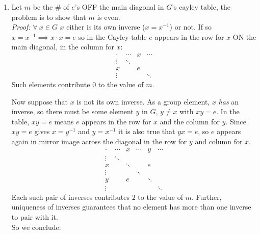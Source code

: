 \begin{enumerate}
    \item Let $m$ be the \# of $e$'s OFF the main diagonal in $G$'s cayley table, the problem is to show that $m$ is even. \\
    \textit{Proof:} $\forall \ x \in G$ $x$ either is its own inverse ($x=x^{-1}$) or not. If so $x=x^{-1} \implies x \cdot x = e$ so in the Cayley table $e$ appears in the row for $x$ ON the main diagonal, in the column for $x$:
     \[
            \begin{array}{c||c|c|c}
                \cdot & \cdots & x & \cdots \\  
                \hline \hline
                 \vdots & \ddots &  &   \\ \hline
                x &  & e &   \\ \hline
                \vdots &  &   & \ddots
            \end{array}
    \] Such elements contribute $0$ to the value of $m$. \\ \steezybreak

    Now suppose that $x$ is not its own inverse. As a group element, $x$ \textit{has} an inverse, so there must be some element $y$ in $G$, $y\neq x$ with $xy=e$. In the table, $xy=e$ means $e$ appears in the row for $x$ and the column for $y$. Since $xy=e$ gives $x=y^{-1}$ and $y=x^{-1}$ it is also true that $yx=e$, so $e$ appears again in mirror image across the diagonal in the row for $y$ and column for $x$. \\
    
    \[
            \begin{array}{c||c|c|c|c|c}
                \cdot & \cdots & x & \cdots &y &\cdots  \\  
                \hline \hline
                 \vdots & \ddots &  &   & &\\ \hline
                x &  & \ddots &   & e &\\ \hline
                \vdots &  &   & \ddots & &  \\ \hline
                y & & e & &  \ddots& \\ \hline
                \vdots & & & & & \ddots
            \end{array}
    \] 
    Each such pair of inverses contributes $2$ to the value of $m$. Further, uniqueness of inverses guarantees that no element has more than one inverse to pair with it.\\
    
    So we conclude: \\


\end{enumerate}
